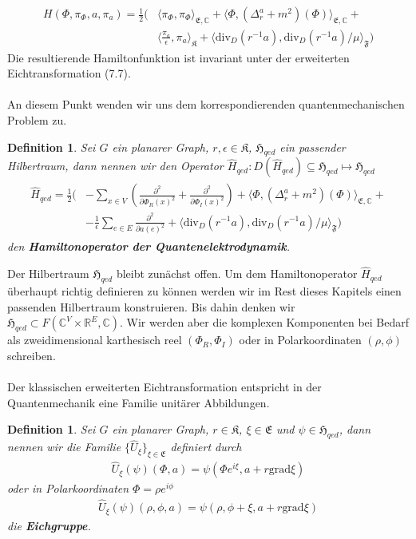 \documentclass[11pt,a4paper,leqno]{report}
\newtheorem{definition}[theorem]{Definition}
\numberwithin{equation}{chapter}
\begin{document}
\begin{align*}
	H(\Phi, \pi_\Phi, a, \pi_a) = \frac{1}{2}(&\langle \pi_\Phi, \pi_\Phi\rangle_{\mathfrak{E},\mathbb{C}}+\langle \Phi, (\Delta_r^a + m^2)(\Phi)\rangle_{\mathfrak{E},\mathbb{C}}+\\ &\langle \frac{\pi_a}{\epsilon}, \pi_a\rangle_{\mathfrak{K}} + \langle \text{div}_D(r^{-1}a), \text{div}_D(r^{-1}a)/\mu\rangle_{\mathfrak{F}}) 
\end{align*}
Die resultierende Hamiltonfunktion ist invariant unter der erweiterten Eichtransformation (7.7). \\
\\
An diesem Punkt wenden wir uns dem korrespondierenden quantenmechanischen Problem zu.
\begin{definition}
	Sei $G$ ein planarer Graph, $r,\epsilon\in\mathfrak{K}$, $\mathfrak{H}_{qed}$ ein passender Hilbertraum, dann nennen wir den Operator $\hat{H}_{qed}:D(\hat{H}_{qed})\subseteq\mathfrak{H}_{qed}\mapsto\mathfrak{H}_{qed}$
	\begin{align}
		\begin{split}
		\hat{H}_{qed} = \frac{1}{2}(&-\sum_{x\in V}(\frac{\partial^2}{\partial\Phi_R(x)^2} +\frac{\partial^2}{\partial\Phi_I(x)^2})+\langle \Phi, (\Delta_r^a + m^2)(\Phi)\rangle_{\mathfrak{E},\mathbb{C}}+\\ &-\frac{1}{\epsilon}\sum_{e\in E}\frac{\partial^2}{\partial a(e)^2} + \langle \text{div}_D(r^{-1}a), \text{div}_D(r^{-1}a)/\mu\rangle_{\mathfrak{F}}) 
		\end{split}	
	\end{align}
	den \textbf{Hamiltonoperator der Quantenelektrodynamik}.
\end{definition}
\noindent
Der Hilbertraum $\mathfrak{H}_{qed}$ bleibt zun\"achst offen. Um dem Hamiltonoperator $\hat{H}_{qed}$ \"uberhaupt richtig definieren zu k\"onnen werden wir im Rest dieses Kapitels einen passenden Hilbertraum konstruieren. Bis dahin denken wir $\mathfrak{H}_{qed}\subset F(\mathbb{C}^V\times\mathbb{R}^E,\mathbb{C})$. Wir werden aber die komplexen Komponenten bei Bedarf als zweidimensional karthesisch reel $(\Phi_R,\Phi_I)$ oder in Polarkoordinaten $(\rho,\phi)$ schreiben.\\
\\
Der klassischen erweiterten Eichtransformation entspricht in der Quantenmechanik eine Familie unit\"arer Abbildungen.
\begin{definition}
	Sei $G$ ein planarer Graph, $r\in\mathfrak{K}$, $\xi\in \mathfrak{E}$ und $\psi\in\mathfrak{H}_{qed}$,  dann nennen wir die Familie $\{\hat{U}_\xi\}_{\xi\in \mathfrak{E}}$ definiert durch
	\begin{align}
		\hat{U}_\xi(\psi)(\Phi, a) =  \psi(\Phi e^{i\xi}, a + r \text{grad}\xi)
	\end{align}
    oder in Polarkoordinaten $\Phi = \rho e^{i\phi}$
    \begin{align}
    	\hat{U}_\xi(\psi)(\rho, \phi, a)=  \psi(\rho, \phi + \xi, a + r \text{grad}\xi)
    \end{align}
	die \textbf{Eichgruppe}.
\end{definition}
\end{document}
